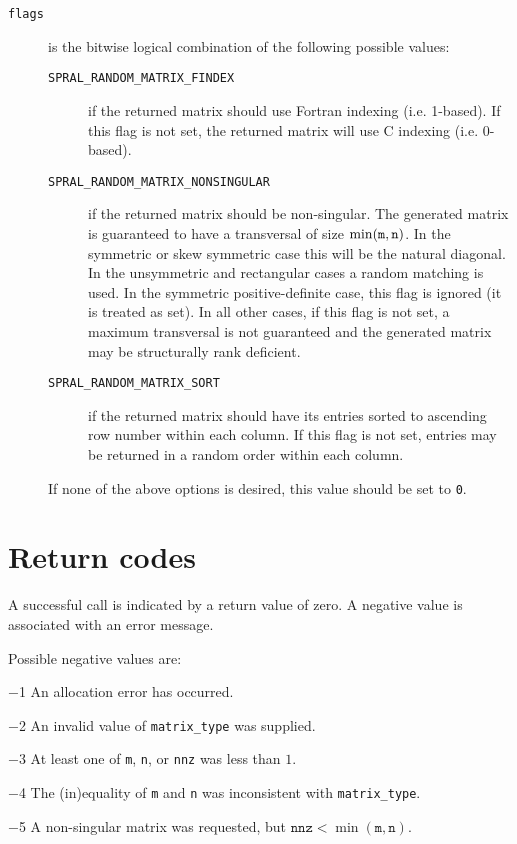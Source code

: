 \begin{description}
\item[\texttt{flags}] is the bitwise logical combination of the following
   possible values:
   \begin{description}
      \item[\texttt{SPRAL\_RANDOM\_MATRIX\_FINDEX}] if the returned matrix
         should use Fortran indexing (i.e. 1-based). If this flag is not
         set, the returned matrix will use C indexing (i.e. 0-based).
      \item[\texttt{SPRAL\_RANDOM\_MATRIX\_NONSINGULAR}] if the returned matrix
         should be non-singular. The generated matrix is guaranteed to have a
         transversal of size $\min({\tt m}, {\tt n})$. In the symmetric or skew
         symmetric case this will be the natural diagonal. In the unsymmetric
         and rectangular cases a random matching is used. In the symmetric
         positive-definite case, this flag is ignored (it is treated as set).
         In all other cases, if this flag is not set, a maximum transversal is
         not guaranteed and the generated matrix may be structurally rank
         deficient.
      \item[\texttt{SPRAL\_RANDOM\_MATRIX\_SORT}] if the returned matrix should
         have its entries sorted to ascending row number within each column. If
         this flag is not set, entries may be returned in a random order within
         each column.
   \end{description}
   If none of the above options is desired, this value should be set to
   \texttt{0}.

\end{description}


\section{Return codes} \label{random_matrix: return values}

A successful call is indicated by a return value of zero.
A negative value is associated with an error message.

Possible negative values are:

\begin{description}
\item{$-$1} An allocation error has occurred.
\item{$-$2} An invalid value of {\tt matrix\_type} was supplied.
\item{$-$3} At least one of {\tt m}, {\tt n}, or {\tt nnz} was less than $1$.
\item{$-$4} The (in)equality of {\tt m} and {\tt n} was inconsistent with
   {\tt matrix\_type}.
\item{$-$5} A non-singular matrix was requested, but $\texttt{nnz}<\min(\texttt{m},\texttt{n})$.
\end{description}

